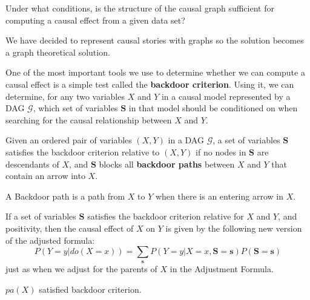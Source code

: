 \begin{center}
      Under what conditions, is the structure of the causal graph sufficient for
      computing a causal effect from a given data set?
\end{center}

We have decided to represent causal stories with graphs so the solution becomes
a graph theoretical solution.

One of the most important tools we use to determine whether we can compute a
causal effect is a simple test called the \textbf{backdoor criterion}. Using it,
we can determine, for any two variables $X$ and $Y$ in a causal model represented
by a DAG $\mathcal{G}$, which set of variables $\mathbf{S}$ in that model should
be conditioned on when searching for the causal relationship between $X$ and $Y$.

\begin{definition}
      Given an ordered pair of variables $(X, Y)$ in a DAG $\mathcal{G}$, a set
      of variables $\mathbf{S}$ satisfies the backdoor criterion relative to $(X, Y)$
      if no nodes in $\mathbf{S}$ are descendants of $X$, and $\mathbf{S}$ blocks
      all \textbf{backdoor paths} between $X$ and $Y$ that contain an arrow into $X$.
\end{definition}
\begin{definition}
      A Backdoor path is a path from $X$ to $Y$ when there is an entering arrow
      in $X$.
\end{definition}
\begin{definition}
      If a set of variables $\mathbf{S}$ satisfies the backdoor criterion relative
      for $X$ and $Y$, and positivity, then the causal effect of $X$ on $Y$ is
      given by the following new version of the adjusted formula:
      \begin{equation}
            P(Y = y| do(X = x)) = \sum_{\mathbf{s}} P(Y = y| X = x, \mathbf{S} = \mathbf{s})P(\mathbf{S} = \mathbf{s})
      \end{equation}
      just as when we adjust for the parents of $X$ in the Adjustment Formula.
\end{definition}
\begin{note}
      $pa(X)$ satisfied backdoor criterion.
\end{note}

